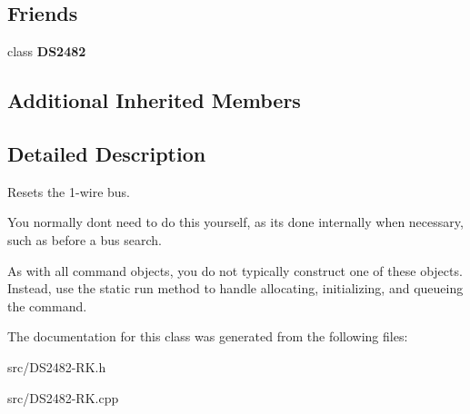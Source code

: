 \subsection*{Friends}
\begin{DoxyCompactItemize}
\item 
\mbox{\label{class_d_s24821_wire_reset_afeaf69274324e8dbeebede05c02d9c18}} 
class {\bfseries D\+S2482}
\end{DoxyCompactItemize}
\subsection*{Additional Inherited Members}


\subsection{Detailed Description}
Resets the 1-\/wire bus. 

You normally don\textquotesingle{}t need to do this yourself, as it\textquotesingle{}s done internally when necessary, such as before a bus search.

As with all command objects, you do not typically construct one of these objects. Instead, use the static run method to handle allocating, initializing, and queueing the command. 

The documentation for this class was generated from the following files\+:\begin{DoxyCompactItemize}
\item 
src/D\+S2482-\/\+R\+K.\+h\item 
src/D\+S2482-\/\+R\+K.\+cpp\end{DoxyCompactItemize}
